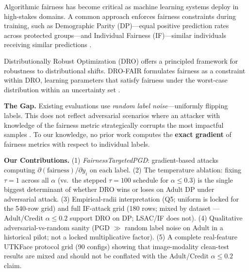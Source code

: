 Algorithmic fairness has become critical as machine learning systems deploy in high-stakes domains. A common approach enforces fairness constraints during training, such as Demographic Parity (DP)---equal positive prediction rates across protected groups---and Individual Fairness (IF)---similar individuals receiving similar predictions \citep{hardt2016equality,dwork2012fairness}.

Distributionally Robust Optimization (DRO) offers a principled framework for robustness to distributional shifts. DRO-FAIR formulates fairness as a constraint within DRO, learning parameters that satisfy fairness under the worst-case distribution within an uncertainty set \citep{hashimoto2018fairness}.

\textbf{The Gap.} Existing evaluations use \textit{random label noise}---uniformly flipping labels. This does not reflect adversarial scenarios where an attacker with knowledge of the fairness metric strategically corrupts the most impactful samples \citep{solans2021poisoning}. To our knowledge, no prior work computes the \textbf{exact gradient} of fairness metrics with respect to individual labels.

\textbf{Our Contributions.}
(1) \textit{FairnessTargetedPGD}: gradient-based attacks computing
$\partial(\text{fairness})/\partial y_i$ on each label.
(2) The temperature ablation: fixing $\tau=1$ across all $\alpha$ (vs.\
the stepped $\tau{=}100$ schedule for $\alpha\le 0.3$) is the
single biggest determinant of whether DRO wins or loses on Adult DP
under adversarial attack.
(3) Empirical-radii interpretation (Q5; uniform is locked for the 540-row
grid) and full IF-attack grid (180 rows; mixed by dataset --- Adult/Credit
$\alpha\le0.2$ support DRO on DP; LSAC/IF does not).
(4) Qualitative adversarial-vs-random sanity (PGD $\gg$ random label noise
on Adult in a historical pilot; not a locked multiplicative factor).
(5) A complete real-feature UTKFace protocol grid (90 configs) showing
that image-modality clean-test results are mixed and should not be
conflated with the Adult/Credit $\alpha\le0.2$ claim.
